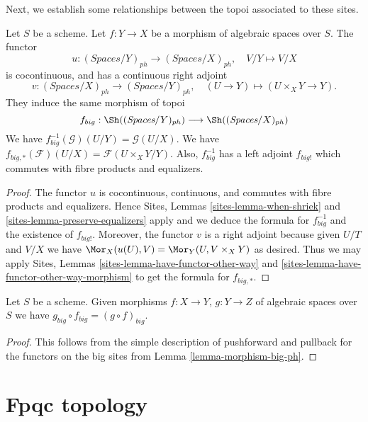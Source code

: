 \noindent
Next, we establish some relationships between the topoi
associated to these sites.

\begin{lemma}
\label{lemma-morphism-big-ph}
Let $S$ be a scheme.
Let $f : Y \to X$ be a morphism of algebraic spaces over $S$.
The functor
$$
u : (\textit{Spaces}/Y)_{ph} \longrightarrow (\textit{Spaces}/X)_{ph},
\quad
V/Y \longmapsto V/X
$$
is cocontinuous, and has a continuous right adjoint
$$
v : (\textit{Spaces}/X)_{ph} \longrightarrow (\textit{Spaces}/Y)_{ph},
\quad
(U \to Y) \longmapsto (U \times_X Y \to Y).
$$
They induce the same morphism of topoi
$$
f_{big} :
\Sh((\textit{Spaces}/Y)_{ph})
\longrightarrow
\Sh((\textit{Spaces}/X)_{ph})
$$
We have $f_{big}^{-1}(\mathcal{G})(U/Y) = \mathcal{G}(U/X)$.
We have $f_{big, *}(\mathcal{F})(U/X) = \mathcal{F}(U \times_X Y/Y)$.
Also, $f_{big}^{-1}$ has a left adjoint $f_{big!}$ which commutes with
fibre products and equalizers.
\end{lemma}

\begin{proof}
The functor $u$ is cocontinuous, continuous, and commutes with fibre products
and equalizers. Hence
Sites, Lemmas \ref{sites-lemma-when-shriek} and
\ref{sites-lemma-preserve-equalizers}
apply and we deduce the formula
for $f_{big}^{-1}$ and the existence of $f_{big!}$. Moreover,
the functor $v$ is a right adjoint because given $U/T$ and $V/X$
we have $\Mor_X(u(U), V) = \Mor_Y(U, V \times_X Y)$
as desired. Thus we may apply
Sites, Lemmas \ref{sites-lemma-have-functor-other-way} and
\ref{sites-lemma-have-functor-other-way-morphism} to get the
formula for $f_{big, *}$.
\end{proof}

\begin{lemma}
\label{lemma-composition-ph}
Let $S$ be a scheme. Given morphisms $f : X \to Y$, $g : Y \to Z$
of algebraic spaces over $S$ we have
$g_{big} \circ f_{big} = (g \circ f)_{big}$.
\end{lemma}

\begin{proof}
This follows from the simple description of pushforward
and pullback for the functors on the big sites from
Lemma \ref{lemma-morphism-big-ph}.
\end{proof}











\section{Fpqc topology}
\label{section-fpqc}

